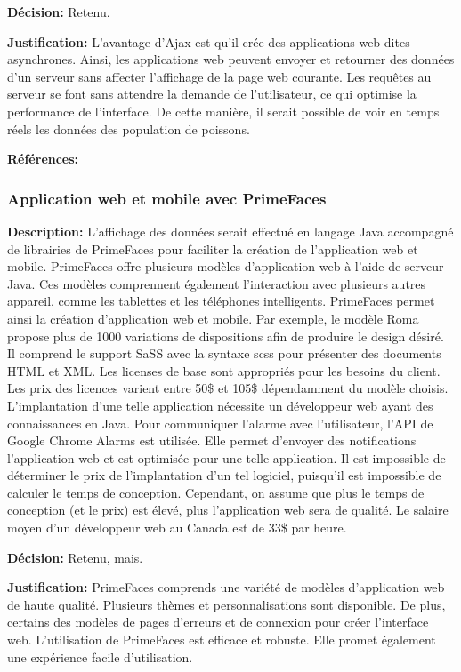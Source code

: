 \textbf{Décision:} Retenu.

\textbf{Justification:} L'avantage d'Ajax est qu'il crée des applications web dites asynchrones. Ainsi, les applications web peuvent envoyer et retourner des données d'un serveur sans affecter l'affichage de la page web courante. Les requêtes au serveur se font sans attendre la demande de l'utilisateur, ce qui optimise la performance de l'interface. De cette manière, il serait possible de voir en temps réels les données des population de poissons.

\textbf{Références:} \cite{Ajax_wiki} \cite{Ajax} \cite{Csoft} \cite{Pushover}

\subsubsection{Application web et mobile avec PrimeFaces}

\textbf{Description:} L'affichage des données serait effectué en langage Java accompagné de librairies de PrimeFaces pour faciliter la création de l'application web et mobile. PrimeFaces offre plusieurs modèles d'application web à l'aide de serveur Java. Ces modèles comprennent également l'interaction avec plusieurs autres appareil, comme les tablettes et les téléphones intelligents. PrimeFaces permet ainsi la création d'application web et mobile. Par exemple, le modèle Roma propose plus de 1000 variations de dispositions afin de produire le design désiré. Il comprend le support SaSS avec la syntaxe scss pour présenter des documents HTML et XML. Les licenses de base sont appropriés pour les besoins du client. Les prix des licences varient entre 50\$ et 105\$ dépendamment du modèle choisis. L'implantation d'une telle application nécessite un développeur web ayant des connaissances en Java. Pour communiquer l'alarme avec l'utilisateur, l'API de Google Chrome Alarms est utilisée. Elle permet d'envoyer des notifications l'application web et est optimisée pour une telle application. Il est impossible de déterminer le prix de l'implantation d'un tel logiciel, puisqu'il est impossible de calculer le temps de conception. Cependant, on assume que plus le temps de conception (et le prix) est élevé, plus l'application web sera de qualité. Le salaire moyen d'un développeur web au Canada est de 33\$ par heure.

\textbf{Décision:} Retenu, mais.

\textbf{Justification:} PrimeFaces comprends une variété de modèles d'application web de haute qualité. Plusieurs thèmes et personnalisations sont disponible. De plus, certains des modèles de pages d'erreurs et de connexion pour créer l'interface web. L'utilisation de PrimeFaces est efficace et robuste. Elle promet également une expérience facile d'utilisation.

